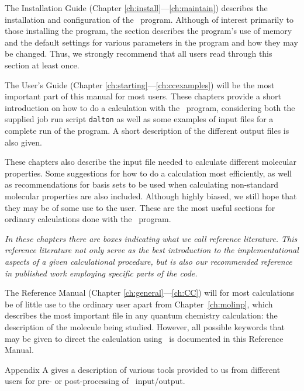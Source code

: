 \begin{description}
\item The Installation Guide (Chapter
\ref{ch:install}---\ref{ch:maintain}) describes the
installation and configuration of the \dalton\ program. Although of
interest primarily to those installing the program, the section
describes the program's use of memory and the default settings for
various parameters in the program and how they may be changed. Thus,
we strongly recommend that all users read through this section at least
once.

\item The User's Guide (Chapter
\ref{ch:starting}---\ref{ch:ccexamples}) will be the most important
part of this manual for most users. These chapters provide a  short
introduction on how to do a calculation with the \dalton\ program,
considering both the supplied job run script {\tt dalton}
as well as some examples of
input files for a complete run of the program. A short description of
the different output files is also given.

These chapters also describe the input file needed to
calculate different molecular properties. Some
suggestions for how to do a calculation most efficiently, as well as
recommendations for basis sets to be used when calculating non-standard
molecular properties are also included. Although highly biased, we
still hope that they may be of some
use to the user. These are the most useful sections for
ordinary calculations done with the \dalton\ program.

{\em In these chapters there are boxes indicating what we call {\em
reference literature}. This reference
literature not only serve as
the best introduction to the implementational aspects of a given
calculational procedure, but is also our recommended reference in published
work employing specific parts of the code.}

\item The Reference Manual (Chapter \ref{ch:general}---\ref{ch:CC})
will for most calculations be of
little use to the ordinary user apart from Chapter~\ref{ch:molinp},
which describes
the most important file in any quantum chemistry calculation: the
description of the molecule being studied. However, all possible
keywords that may be given to direct the calculation using \dalton\ is
documented in this Reference Manual.

\item Appendix A gives a description of various tools provided to us
from different users for pre- or post-processing of \dalton\
input/output.
\end{description}

